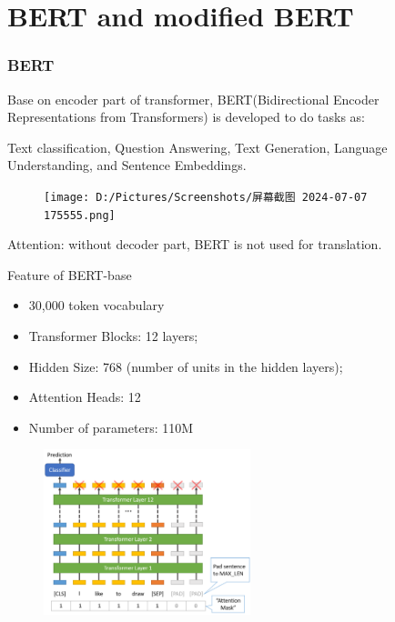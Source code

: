 \documentclass{beamer}
\begin{document}
\section{BERT and modified BERT}
\begin{frame}
  \frametitle{BERT}
  Base on encoder part of transformer\cite{vaswani2023attentionneed}, BERT(Bidirectional Encoder Representations from Transformers)\cite{devlin2019bertpretrainingdeepbidirectional} is developed to do tasks as: 
  
  Text classification, Question Answering, Text Generation, Language Understanding, and Sentence Embeddings.
  \begin{figure}[H]
    \centering
    \texttt{[image: D:/Pictures/Screenshots/屏幕截图 2024-07-07 175555.png]}
  \end{figure}
  Attention: without decoder part, BERT is not used for translation.
\end{frame}
\begin{frame}{Feature of BERT-base}
  \begin{itemize}
    \item 30,000 token vocabulary
    \item Transformer Blocks: 12 layers;
    \item Hidden Size: 768 (number of units in the hidden layers);
    \item Attention Heads: 12
    \item Number of parameters: 110M
  \end{itemize}
  \begin{figure}[H]
    \centering
    \includegraphics[width=6cm]{pictures/padding_and_mask.png}
  \end{figure}
\end{frame}
\end{document}
